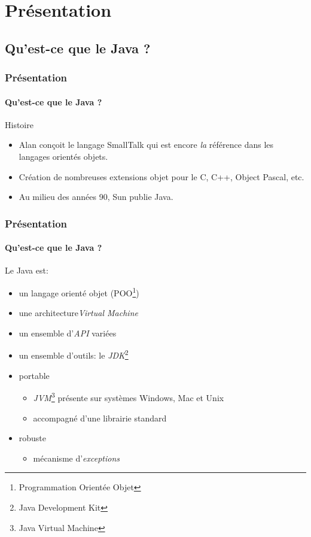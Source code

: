 \section{Présentation}

	\subsection{Qu'est-ce que le Java ?}
	
		\begin{frame}
			\frametitle{Présentation}
			\framesubtitle{Qu'est-ce que le Java ?}
			\begin{block}{Histoire}
				\begin{itemize}[<+->]
					\item Alan  conçoit le langage \og SmallTalk\fg{} qui est encore \emph{la} référence dans les langages orientés objets.
					\item Création de nombreuses extensions objet pour le C, C++, Object Pascal, etc.
					\item Au milieu des années 90, Sun publie Java.
				\end{itemize}
			\end{block}
		\end{frame}
	
		\begin{frame}
			\frametitle{Présentation}
			\framesubtitle{Qu'est-ce que le Java ?}
			Le Java est:
			\begin{itemize}[<+->]
				\item un langage orienté objet (POO\footnote{Programmation Orientée Objet})
				\item une architecture\emph{Virtual Machine}
				\item un ensemble d'\emph{API} variées
				\item un ensemble d'outils: le \emph{JDK}\footnote{Java Development Kit}
				\item portable
					\begin{itemize}
						\item \emph{JVM}\footnote{Java Virtual Machine} présente sur systèmes Windows, Mac et Unix
						\item accompagné d'une librairie standard
					\end{itemize}
				\item robuste
					\begin{itemize}
						\item mécanisme d'\emph{exceptions}
					\end{itemize}
			\end{itemize}
		\end{frame}	
	
